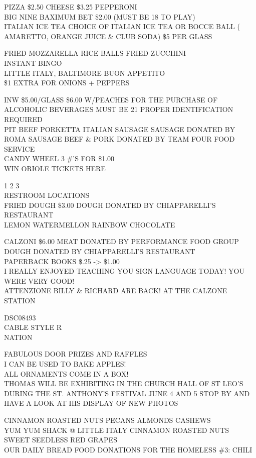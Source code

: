 \documentclass[10pt,letterpaper]{article}
\begin{document}
PIZZA \$2.50 CHEESE \$3.25 PEPPERONI\\
BIG NINE BAXIMUM BET \$2.00 (MUST BE 18 TO PLAY)\\
ITALIAN ICE TEA CHOICE OF ITALIAN ICE TEA OR BOCCE BALL ( AMARETTO, ORANGE JUICE \& CLUB SODA) \$5 PER GLASS

FRIED MOZZARELLA RICE BALLS FRIED ZUCCHINI\\
INSTANT BINGO\\
LITTLE ITALY, BALTIMORE BUON APPETITO\\
\$1 EXTRA FOR ONIONS + PEPPERS

INW \$5.00/GLASS \$6.00 W/PEACHES FOR THE PURCHASE OF ALCOHOLIC BEVERAGES MUST BE 21 PROPER IDENTIFICATION REQUIRED\\
PIT BEEF PORKETTA ITALIAN SAUSAGE SAUSAGE DONATED BY ROMA SAUSAGE BEEF \& PORK DONATED BY TEAM FOUR FOOD SERVICE\\
CANDY WHEEL 3 \#'S FOR \$1.00\\
WIN ORIOLE TICKETS HERE

1 2 3\\
RESTROOM LOCATIONS\\
FRIED DOUGH \$3.00 DOUGH DONATED BY CHIAPPARELLI'S RESTAURANT\\
LEMON WATERMELLON RAINBOW CHOCOLATE

CALZONI \$6.00 MEAT DONATED BY PERFORMANCE FOOD GROUP DOUGH DONATED BY CHIAPPARELLI'S RESTAURANT\\
PAPERBACK BOOKS \$.25 {-}> \$1.00\\
I REALLY ENJOYED TEACHING YOU SIGN LANGUAGE TODAY!  YOU WERE VERY GOOD!\\
ATTENZIONE BILLY \& RICHARD ARE BACK! AT THE CALZONE STATION

DSC08493\\
CABLE STYLE R\\
NATION

FABULOUS DOOR PRIZES AND RAFFLES\\
I CAN BE USED TO BAKE APPLES!\\
ALL ORNAMENTS COME IN A BOX!\\
THOMAS WILL BE EXHIBITING IN THE CHURCH HALL OF ST LEO'S DURING THE ST. ANTHONY'S FESTIVAL JUNE 4 AND 5 STOP BY AND HAVE A LOOK AT HIS DISPLAY OF NEW PHOTOS

CINNAMON ROASTED NUTS PECANS ALMONDS CASHEWS\\
YUM YUM SHACK @ LITTLE ITALY CINNAMON ROASTED NUTS\\
SWEET SEEDLESS RED GRAPES\\
OUR DAILY BREAD FOOD DONATIONS FOR THE HOMELESS \#3: CHILI
\end{document}
